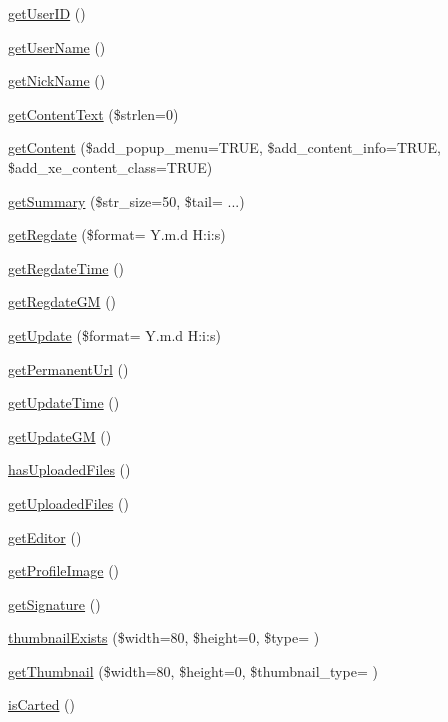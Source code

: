 \begin{DoxyCompactItemize}
\hyperlink{classcommentItem_a5c793e6542e731da5d465c35c77b42fd}{get\+User\+I\+D} ()
\item 
\hyperlink{classcommentItem_a1c35032d37e80ad5018a02787f0091fe}{get\+User\+Name} ()
\item 
\hyperlink{classcommentItem_a097673677cd1c461040cbc9275b7fca9}{get\+Nick\+Name} ()
\item 
\hyperlink{classcommentItem_a5bd758e385068bff00ffc35a0737ff72}{get\+Content\+Text} (\$strlen=0)
\item 
\hyperlink{classcommentItem_afae7151c28cc9066f9c40a010597b25a}{get\+Content} (\$add\+\_\+popup\+\_\+menu=T\+R\+U\+E, \$add\+\_\+content\+\_\+info=T\+R\+U\+E, \$add\+\_\+xe\+\_\+content\+\_\+class=T\+R\+U\+E)
\item 
\hyperlink{classcommentItem_aabe11142b19d831c5e3120e48bb169f7}{get\+Summary} (\$str\+\_\+size=50, \$tail= \textquotesingle{}...\textquotesingle{})
\item 
\hyperlink{classcommentItem_acae004be4282c96181e79cc0f3b3adfa}{get\+Regdate} (\$format= \textquotesingle{}Y.\+m.\+d H\+:i\+:s\textquotesingle{})
\item 
\hyperlink{classcommentItem_adb5754f10a245c54a0beb4f6fb22f0e3}{get\+Regdate\+Time} ()
\item 
\hyperlink{classcommentItem_ae5f0203691b6d16a2d99ae40d67adb3f}{get\+Regdate\+G\+M} ()
\item 
\hyperlink{classcommentItem_aa7a413ef04f4c64c779a8bb119a5c214}{get\+Update} (\$format= \textquotesingle{}Y.\+m.\+d H\+:i\+:s\textquotesingle{})
\item 
\hyperlink{classcommentItem_adc6e6a36fd7c02a2f0fecc8a22f9b13b}{get\+Permanent\+Url} ()
\item 
\hyperlink{classcommentItem_a59d0264c1b6842c6a0dfa21a6dfe1edb}{get\+Update\+Time} ()
\item 
\hyperlink{classcommentItem_aab0135e2edd37a47cc390da9b4c79dfa}{get\+Update\+G\+M} ()
\item 
\hyperlink{classcommentItem_abe1774ffe4e8c0f5c14822c5698433da}{has\+Uploaded\+Files} ()
\item 
\hyperlink{classcommentItem_aaa9c1ef5cfd0ce69fd83d8d980360ee5}{get\+Uploaded\+Files} ()
\item 
\hyperlink{classcommentItem_aa27b1c1916b9df510c495655af07bfdf}{get\+Editor} ()
\item 
\hyperlink{classcommentItem_a9baa56f4aa9515c433494778e75c9e85}{get\+Profile\+Image} ()
\item 
\hyperlink{classcommentItem_a97eea3e5359c0ffe84db781d5e5fbff6}{get\+Signature} ()
\item 
\hyperlink{classcommentItem_a1523ec4128cf464d13ca1fb1c2078a0f}{thumbnail\+Exists} (\$width=80, \$height=0, \$type= \textquotesingle{}\textquotesingle{})
\item 
\hyperlink{classcommentItem_a9ba96d0703304547c3f494403a86e522}{get\+Thumbnail} (\$width=80, \$height=0, \$thumbnail\+\_\+type= \textquotesingle{}\textquotesingle{})
\item 
\hyperlink{classcommentItem_aee548a05480bd060de454017aa8be318}{is\+Carted} ()
\end{DoxyCompactItemize}
